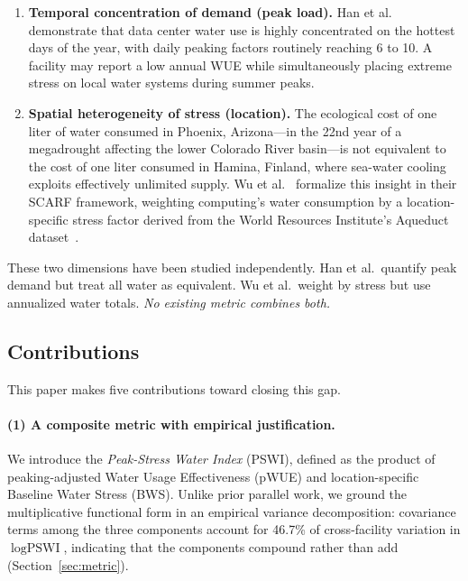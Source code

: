 \documentclass[conference,10pt]{IEEEtran}
\begin{document}
\begin{enumerate}
    \item \textbf{Temporal concentration of demand (peak load).} Han et
        al.~\cite{han2026} demonstrate that data center water use is
        highly concentrated on the hottest days of the year, with daily
        peaking factors routinely reaching 6 to 10. A facility may report
        a low annual WUE while simultaneously placing extreme stress on
        local water systems during summer peaks.

    \item \textbf{Spatial heterogeneity of stress (location).} The
        ecological cost of one liter of water consumed in Phoenix,
        Arizona---in the 22nd year of a megadrought affecting the lower
        Colorado River basin---is not equivalent to the cost of one liter
        consumed in Hamina, Finland, where sea-water cooling exploits
        effectively unlimited supply. Wu et al.~\cite{wu2025scarf}
        formalize this insight in their SCARF framework, weighting
        computing's water consumption by a location-specific stress factor
        derived from the World Resources Institute's Aqueduct
        dataset~\cite{kuzma2023aqueduct}.
\end{enumerate}

These two dimensions have been studied independently. Han et al.\ quantify
peak demand but treat all water as equivalent. Wu et al.\ weight by stress
but use annualized water totals. \emph{No existing metric combines both.}

\subsection{Contributions}

This paper makes five contributions toward closing this gap.

\paragraph{(1) A composite metric with empirical justification.}
We introduce the \emph{Peak-Stress Water Index} (PSWI), defined as the
product of peaking-adjusted Water Usage Effectiveness (pWUE) and
location-specific Baseline Water Stress (BWS). Unlike prior parallel
work, we ground the multiplicative functional form in an empirical
variance decomposition: covariance terms among the three components
account for 46.7\% of cross-facility variation in $\log\textrm{PSWI}$,
indicating that the components compound rather than add
(Section~\ref{sec:metric}).
\end{document}
